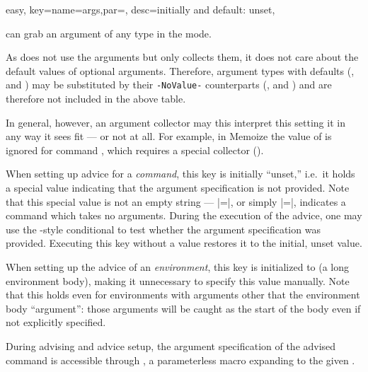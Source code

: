 \documentclass[a4paper,11pt]{article}
\begin{document}
\begin{doc}{easy,
    key={name=args,par=, desc=initially and default: unset},
  }
\begin{tcolorbox}[float, before float=\hfill,
      title={The {\pkg[white]{xparse}} argument specification
        (as understood by \refcmd[link color=white]{CollectArguments})}]
    \smallskip
    
     can grab an argument of any type in the
     mode.
    
    As  does not use the arguments but only collects
    them, it does not care about the default values of optional arguments.
    Therefore, argument types with defaults (,
     and ) may be substituted by their
    \texttt{-NoValue-} counterparts (,  and
    ) and are therefore not included in the above table.
  \end{tcolorbox}

  In general, however, an argument collector may this interpret this setting it
  in any way it sees fit --- or not at all.  For example, in Memoize the value
  of  is ignored for command , which requires a special
  collector ().
  
  When setting up advice for a \emph{command}, this key is initially
  ``unset,'' i.e.\ it holds a special value indicating that the argument
  specification is not provided.  Note that this special value is not an empty
  string --- |={}|, or simply |=|, indicates
  a command which takes no arguments.  During the execution of the advice, one
  may use the -style conditional
   to test
  whether the argument specification was provided.  Executing this key without
  a value restores it to the initial, unset value.
  
  When setting up the advice of an \emph{environment}, this key is
  initialized to  (a long environment body),
  making it unnecessary to specify this value manually.  Note that this holds
  even for environments with arguments other that the environment body
  ``argument'': those arguments will be caught as the start of the body even if
  not explicitly specified.
  
  During advising and advice setup, the argument specification of the advised
  command is accessible through , a parameterless macro
  expanding to the given .
\end{doc}
\end{document}
